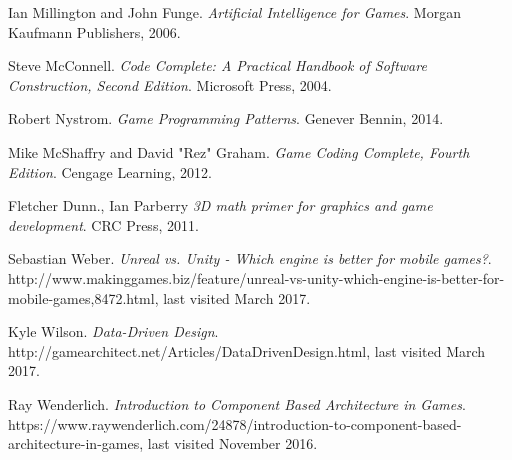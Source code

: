 \documentclass[12pt]{report}
\begin{document}
\begin{thebibliography}{9}
Ian Millington and John Funge. 
\textit{Artificial Intelligence for Games}. 
Morgan Kaufmann Publishers, 2006.

Steve McConnell. 
\textit{Code Complete: A Practical Handbook of Software Construction, Second Edition}. 
Microsoft Press, 2004.

Robert Nystrom. 
\textit{Game Programming Patterns}. 
Genever Bennin, 2014.

Mike McShaffry and David "Rez" Graham. 
\textit{Game Coding Complete, Fourth Edition}. 
Cengage Learning, 2012.

Fletcher Dunn., Ian Parberry
\textit{3D math primer for graphics and game development}. 
CRC Press, 2011.

Sebastian Weber.
\textit{Unreal vs. Unity - Which engine is better for mobile games?}.
http://www.makinggames.biz/feature/unreal-vs-unity-which-engine-is-better-for-mobile-games,8472.html,
last visited March 2017.

Kyle Wilson.
\textit{Data-Driven Design}.
http://gamearchitect.net/Articles/DataDrivenDesign.html,
last visited March 2017.

Ray Wenderlich.
\textit{Introduction to Component Based Architecture in Games}.
https://www.raywenderlich.com/24878/introduction-to-component-based-architecture-in-games,
last visited November 2016.


\end{thebibliography}

\end{document}
